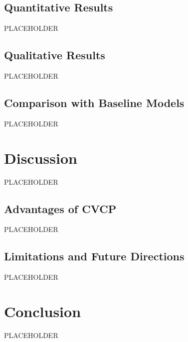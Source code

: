 \documentclass[times, report, parskip, openbib, twocolumn]{article}
\begin{document}
\subsection{Quantitative Results}
PLACEHOLDER

\subsection{Qualitative Results}
PLACEHOLDER

\subsection{Comparison with Baseline Models}
PLACEHOLDER

\section{Discussion}
PLACEHOLDER

\subsection{Advantages of CVCP}
PLACEHOLDER

\subsection{Limitations and Future Directions}
PLACEHOLDER

\section{Conclusion}
PLACEHOLDER

% 
% 
\end{document}
